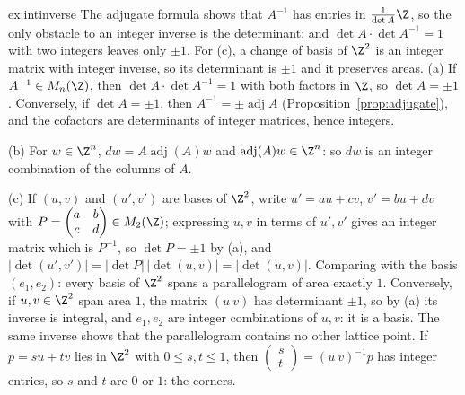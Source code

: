 \begin{solution}{ex:intinverse}
\idea The adjugate formula shows that $A^{-1}$ has entries in $\frac1{\det A}\Z$, so the only obstacle to an integer inverse is the determinant; and $\det A\cdot\det A^{-1}=1$ with two integers leaves only $\pm1$. For (c), a change of basis of $\Z^2$ is an integer matrix with integer inverse, so its determinant is $\pm1$ and it preserves areas.
\writeup (a) If $A^{-1}\in M_n(\Z)$, then $\det A\cdot\det A^{-1}=1$ with both factors in $\Z$, so $\det A=\pm1$. Conversely, if $\det A=\pm1$, then $A^{-1}=\pm\operatorname{adj}A$ (Proposition~\ref{prop:adjugate}), and the cofactors are determinants of integer matrices, hence integers.

(b) For $w\in\Z^n$, $dw=A\operatorname{adj}(A)w$ and $\operatorname{adj}(A)w\in\Z^n$: so $dw$ is an integer combination of the columns of $A$.

(c) If $(u,v)$ and $(u',v')$ are bases of $\Z^2$, write $u'=au+cv$, $v'=bu+dv$ with $P=\begin{pmatrix}a&b\\c&d\end{pmatrix}\in M_2(\Z)$; expressing $u,v$ in terms of $u',v'$ gives an integer matrix which is $P^{-1}$, so $\det P=\pm1$ by (a), and $|\det(u',v')|=|\det P|\,|\det(u,v)|=|\det(u,v)|$. Comparing with the basis $(e_1,e_2)$: every basis of $\Z^2$ spans a parallelogram of area exactly $1$. Conversely, if $u,v\in\Z^2$ span area $1$, the matrix $(u\ v)$ has determinant $\pm1$, so by (a) its inverse is integral, and $e_1,e_2$ are integer combinations of $u,v$: it is a basis. The same inverse shows that the parallelogram contains no other lattice point. If $p=su+tv$ lies in $\Z^2$ with $0\le s,t\le 1$, then $\begin{pmatrix}s\\ t\end{pmatrix}=(u\ v)^{-1}p$ has integer entries, so $s$ and $t$ are $0$ or $1$: the corners.
\end{solution}

